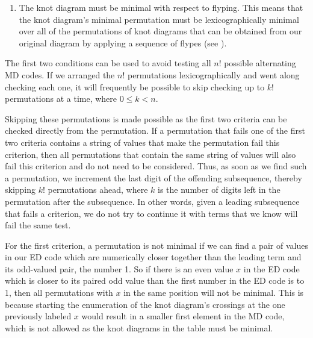 \begin{paper}
\begin{enumerate}
\item The knot diagram must be minimal with respect to flyping.
This means that the knot diagram's minimal permutation must be lexicographically
minimal over all of the permutations of knot diagrams that can be obtained from
our original diagram by applying a sequence of flypes (see \figMoves).
\end{enumerate}

The first two conditions can be used to avoid testing all $n!$ possible
alternating MD codes.
If we arranged the $n!$ permutations lexicographically and went along checking
each one, it will frequently be possible to skip checking up to $k!$
permutations at a time, where $0\leq k<n$.

Skipping these permutations is made possible as the first two criteria can be
checked directly from the permutation.
If a permutation that fails one of the first two criteria contains a string of
values that make the permutation fail this criterion, then all permutations that
contain the same string of values will also fail this criterion and do not need
to be considered.
Thus, as soon as we find such a permutation, we increment the last digit of the
offending subsequence, thereby skipping $k!$ permutations ahead, where $k$ is
the number of digits left in the permutation after the subsequence.
In other words, given a leading subsequence that fails a criterion, we do not
try to continue it with terms that we know will fail the same test.

For the first criterion, a permutation is not minimal if we can find a pair of
values in our ED code which are numerically closer together than the leading
term and its odd-valued pair, the number 1.
So if there is an even value $x$ in the ED code which is closer to its paired
odd value than the first number in the ED code is to 1, then all permutations
with $x$ in the same position will not be minimal.
This is because starting the enumeration of the knot diagram's crossings at the
one previously labeled $x$ would result in a smaller first element in the MD
code, which is not allowed as the knot diagrams in the table must be minimal.



\noindent{}


\end{paper}

